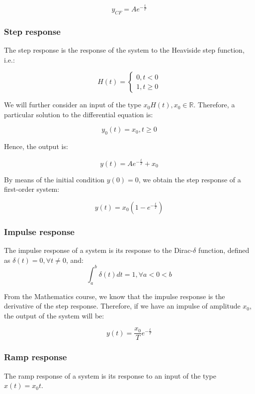 \documentclass[12pt]{article}
\begin{document}
\[ y_{CF} = Ae^{-\frac{t}{T}} \]

\subsubsection{Step response}

\begin{definition}
  The step response is the response of the system to the Heaviside step function, i.e.:
  
  \[ H(t) = \begin{cases}
    0, t < 0 \\
    1, t \geq 0
  \end{cases} \]
\end{definition}

We will further consider an input of the type $x_0H(t), x_0 \in \mathbb{R}$. Therefore, a particular solution to the differential equation is:

\[ y_0(t) = x_0, t \geq 0 \]

Hence, the output is:

\[ y(t) = Ae^{-\frac{t}{T}} + x_0 \]

By means of the initial condition $y(0) = 0$, we obtain the step response of a first-order system:

\[ y(t) = x_0\left(1 - e^{-\frac{t}{T}}\right) \]

\subsubsection{Impulse response}

\begin{definition}
  The impulse response of a system is its response to the Dirac-$\delta$ function, defined as $\delta(t) = 0, \forall t \neq 0$, and:
  \[ \int_a^b \delta(t)dt = 1, \forall a < 0 < b \]
\end{definition}

From the Mathematics course, we know that the impulse response is the derivative of the step response. Therefore, if we have an impulse of amplitude $x_0$, the output of the system will be:

\[ y(t) = \frac{x_0}{T}e^{-\frac{t}{T}} \]

\subsubsection{Ramp response}

\begin{definition}
  The ramp response of a system is its response to an input of the type $x(t) = x_0t$.
\end{definition}
\end{document}

